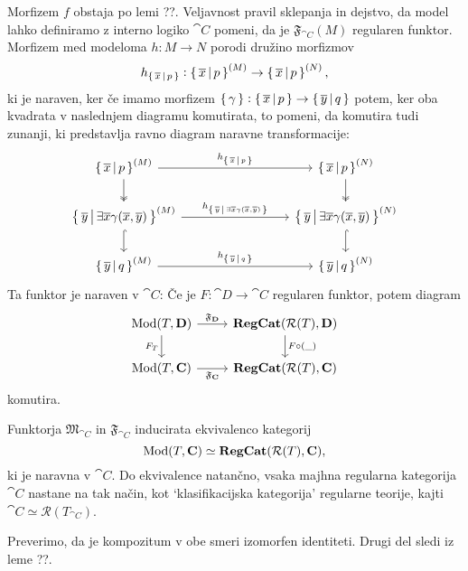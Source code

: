 \documentclass[../kategoricna_logika.tex]{subfiles}
\begin{document}
Morfizem $f$ obstaja po lemi ??. Veljavnost pravil sklepanja in dejstvo, da model lahko definiramo z interno logiko $\cat{C}$ pomeni, da je $\mathfrak{F}_{\cat{C}}(M)$ regularen funktor.
Morfizem med modeloma $h : M \to N$ porodi družino morfizmov 
$$h_{\left\lbrace\,\overline{x}\,\middle|\, p\,\right\rbrace} : \left\lbrace\,\overline{x}\,\middle|\, p\,\right\rbrace^{(M)} \to \left\lbrace\,\overline{x}\,\middle|\, p\,\right\rbrace^{(N)},$$
ki je naraven, ker če imamo morfizem $\left\lbrace\,\gamma\,\right\rbrace : \left\lbrace\,\overline{x}\,\middle|\, p\,\right\rbrace \to \left\lbrace\,\overline{y}\,\middle|\, q\,\right\rbrace$ potem, ker oba kvadrata v naslednjem diagramu komutirata, to pomeni, da komutira tudi zunanji, ki predstavlja ravno diagram naravne transformacije:
\begin{equation*}
  \begin{tikzcd}[column sep=3cm]
    \set{\overline{x}\,\middle|\, p}^{(M)} \ar[d, two heads] \ar[r, "h_{\set{\overline{x}\,\middle|\, p}}"] & \set{\overline{x}\,\middle|\, p}^{(N)} \ar[d, two heads] \\
    \set{\overline{y}\,\middle|\, \exists \overline{x} \gamma(\overline{x}, \overline{y})}^{(M)}  \ar[d, hook] \ar[r, "h_{\set{\overline{y}\,\middle|\, \exists \overline{x} \gamma(\overline{x}, \overline{y})}}"] & \set{\overline{y}\,\middle|\, \exists \overline{x} \gamma(\overline{x}, \overline{y})}^{(N)} \ar[d, hook] \\
    \set{\overline{y}\,\middle|\, q}^{(M)} \ar[r, "h_{\set{\overline{y}\,\middle|\, q}}"] & \set{\overline{y}\,\middle|\, q}^{(N)}
  \end{tikzcd}
\end{equation*}
Ta funktor je naraven v $\cat{C}$: Če je $F : \cat{D} \to \cat{C}$ regularen funktor, potem diagram
\begin{equation}
  \begin{tikzcd}
    \Mod(T, \cat{D}) \ar[d, "F_T"'] \ar[r, "\mathfrak{F}_{\cat{D}}"] & \cat{RegCat}(\mathcal{R}(T), \cat{D}) \ar[d, "F \circ (\_)"] \\
    \Mod(T, \cat{C}) \ar[r, "\mathfrak{F}_{\cat{C}}"'] & \cat{RegCat}(\mathcal{R}(T), \cat{C})
  \end{tikzcd}
\end{equation}
komutira.
\begin{izrek}
  Funktorja $\mathfrak{M}_{\cat{C}}$ in $\mathfrak{F}_{\cat{C}}$ inducirata ekvivalenco kategorij
  $$\operatorname{Mod}(T, {\operatorname{\mathbf{C}}}) \simeq {\operatorname{\mathbf{RegCat}}}(\mathcal{R}(T), {\operatorname{\mathbf{C}}}),$$
  ki je naravna v $\cat{C}$. Do ekvivalence natančno, vsaka majhna regularna kategorija $\cat{C}$ nastane na tak način, kot `klasifikacijska kategorija' regularne teorije, kajti $\cat{C} \simeq \mathcal{R}(T_{\cat{C}})$.
\end{izrek}
\begin{dokaz}
  Preverimo, da je kompozitum v obe smeri izomorfen identiteti. Drugi del sledi iz leme ??.
\end{dokaz}
\end{document}
